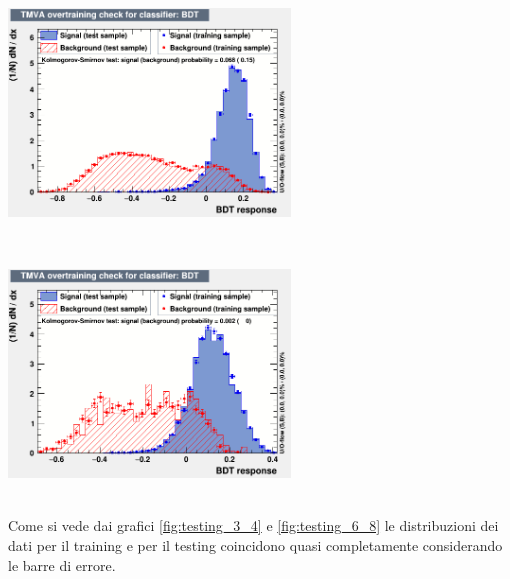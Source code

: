  
    \begin{minipage}{.5\textwidth}%
        \begin{flushleft} \large
        \flushleft
        \includegraphics[width=7.5cm]{training&testing/overtraining_3_4.png}
        \label{fig:testing_3_4}
        \end{flushleft}
        \end{minipage}
    ~
    \begin{minipage}{0.5\textwidth}
        \begin{flushright} \large
        \includegraphics[width=7.5cm]{training&testing/overtraining_6_8.png}
        \label{fig:testing_6_8}
        \end{flushright}
    \end{minipage} \\[1.cm]
    
Come si vede dai grafici \ref{fig:testing_3_4} e \ref{fig:testing_6_8} le distribuzioni dei dati per il training e per il testing coincidono quasi completamente considerando le barre di errore. 